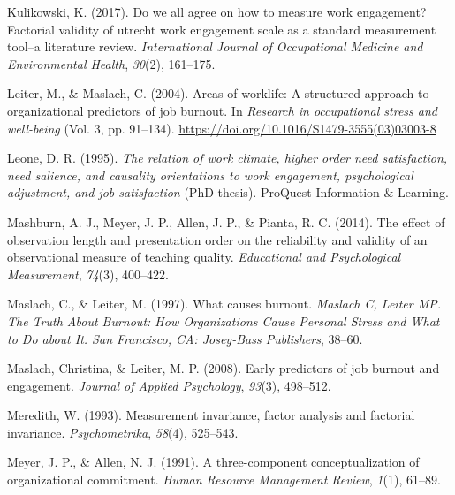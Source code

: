 \documentclass[
  man]{apa6}
\newlength{\cslhangindent}
\newlength{\cslentryspacingunit} %
\newenvironment{CSLReferences}[2] %
 {%
  \setlength{\parindent}{0pt}
  \ifodd #1
  \let\oldpar\par
  \def\par{\hangindent=\cslhangindent\oldpar}
  \fi
  \setlength{\parskip}{#2\cslentryspacingunit}
 }%
 {}
\begin{document}
\begin{CSLReferences}{1}{0}
\leavevmode{}%
Kulikowski, K. (2017). Do we all agree on how to measure work engagement? Factorial validity of utrecht work engagement scale as a standard measurement tool--a literature review. \emph{International Journal of Occupational Medicine and Environmental Health}, \emph{30}(2), 161--175.

\leavevmode{}%
Leiter, M., \& Maslach, C. (2004). Areas of worklife: A structured approach to organizational predictors of job burnout. In \emph{Research in occupational stress and well-being} (Vol. 3, pp. 91--134). \url{https://doi.org/10.1016/S1479-3555(03)03003-8}

\leavevmode{}%
Leone, D. R. (1995). \emph{The relation of work climate, higher order need satisfaction, need salience, and causality orientations to work engagement, psychological adjustment, and job satisfaction} (PhD thesis). ProQuest Information \& Learning.

\leavevmode{}%
Mashburn, A. J., Meyer, J. P., Allen, J. P., \& Pianta, R. C. (2014). The effect of observation length and presentation order on the reliability and validity of an observational measure of teaching quality. \emph{Educational and Psychological Measurement}, \emph{74}(3), 400--422.

\leavevmode{}%
Maslach, C., \& Leiter, M. (1997). What causes burnout. \emph{Maslach C, Leiter MP. The Truth About Burnout: How Organizations Cause Personal Stress and What to Do about It. San Francisco, CA: Josey-Bass Publishers}, 38--60.

\leavevmode{}%
Maslach, Christina, \& Leiter, M. P. (2008). Early predictors of job burnout and engagement. \emph{Journal of Applied Psychology}, \emph{93}(3), 498--512.

\leavevmode{}%
Meredith, W. (1993). Measurement invariance, factor analysis and factorial invariance. \emph{Psychometrika}, \emph{58}(4), 525--543.

\leavevmode{}%
Meyer, J. P., \& Allen, N. J. (1991). A three-component conceptualization of organizational commitment. \emph{Human Resource Management Review}, \emph{1}(1), 61--89.


\end{CSLReferences}
\end{document}
